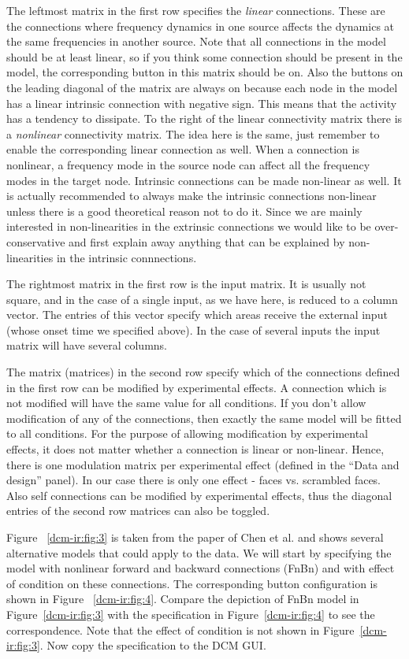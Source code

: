 The leftmost matrix in the first row specifies the \textit{linear} connections. These are the connections where frequency dynamics in one source affects the dynamics at the same frequencies in another source. Note that all connections in the model should be at least linear, so if you think some connection should be present in the model, the corresponding button in this matrix should be on. Also the buttons on the leading diagonal of the matrix are always on because each node in the model has a linear  intrinsic connection with negative sign. This means that the activity has a tendency to dissipate. To the right of the linear connectivity matrix there is a \textit{nonlinear} connectivity matrix. The idea here is the same, just remember to enable the corresponding linear connection as well. When a connection is nonlinear, a frequency mode in the source node can affect all the frequency modes in the target node. Intrinsic connections can be made non-linear as well. It is actually recommended to always make the intrinsic connections non-linear unless there is a good theoretical reason not to do it. Since we are mainly interested in non-linearities in the extrinsic connections we would like to be over-conservative and first explain away anything that can be explained by non-linearities in the intrinsic connnections.

The rightmost matrix in the first row is the input matrix. It is usually not square, and in the case of a single input, as we have here, is reduced to a column vector. The entries of this vector specify which areas receive the external input (whose onset time we specified above). In the case of several inputs the input matrix will have several columns.

The matrix (matrices) in the second row specify which of the connections defined in the first row can be modified by experimental effects. A connection which is not modified will have the same value for all conditions. If you don't allow modification of any of the connections, then exactly the same model will be fitted to all conditions. For the purpose of allowing modification by experimental effects, it does not matter whether a connection is linear or non-linear. Hence, there is one modulation matrix per experimental effect (defined in the ``Data and design'' panel). In our case there is only one effect - faces vs. scrambled faces. Also self connections can be modified by experimental effects, thus the diagonal entries of the second row matrices can also be toggled.

Figure ~\ref{dcm-ir:fig:3} is taken from the paper of Chen et al. \cite{cc_asymm} and shows several alternative models that could apply to the data. We will start by specifying the model with nonlinear forward and backward connections (FnBn) and with effect of condition on these connections. The corresponding button configuration is shown in Figure ~\ref{dcm-ir:fig:4}. Compare the depiction of FnBn model in Figure~\ref{dcm-ir:fig:3}  with the specification in Figure~\ref{dcm-ir:fig:4}  to see the correspondence. Note that the effect of condition is not shown in Figure~\ref{dcm-ir:fig:3}. Now copy the specification to the DCM GUI.

